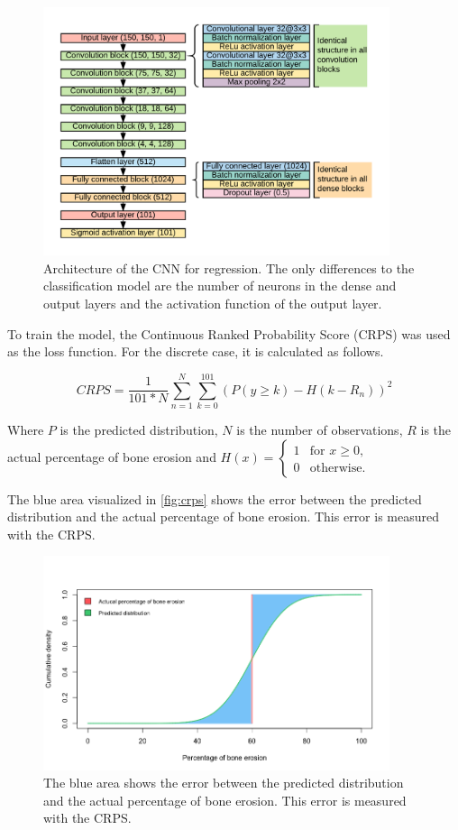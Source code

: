 \documentclass[12pt]{article}
\begin{document}
\begin{figure}[ht]
\includegraphics[width=4in]{cnn_regression}	
\caption{Architecture of the CNN for regression. The only differences to the classification model are the number of neurons in the dense and output layers and the activation function of the output layer.}
\label{fig:cnn_reg}
\end{figure}

To train the model, the Continuous Ranked Probability Score (CRPS) was used as the loss function. For the discrete case, it is calculated as follows. \cite{crps}

$$CRPS = \frac{1}{101 * N} \sum\limits_{n=1}^{N} \sum\limits_{k=0}^{101} (P(y \geq k) - H(k - R_n))^2$$

Where $P$ is the predicted distribution, $N$ is the number of observations, $R$ is the actual percentage of bone erosion and $H(x) = \begin{cases}
1 & \text{for $x \geq 0$,}\\
0 & \text{otherwise.}
\end{cases}$ \cite{crps}

The blue area visualized in \autoref{fig:crps} shows the error between the predicted distribution and the actual percentage of bone erosion. This error is measured with the CRPS. \cite{crps}

\begin{figure}[ht]
\includegraphics[width=4in]{crps}	
\caption{The blue area shows the error between the predicted distribution and the actual percentage of bone erosion. This error is measured with the CRPS.}
\label{fig:crps}
\end{figure}
\end{document}
